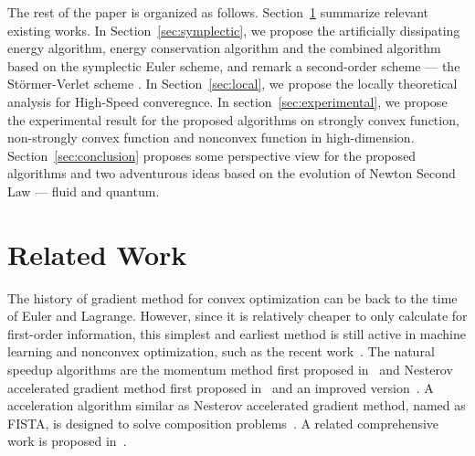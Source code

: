 \documentclass[11pt,fceqn]{article}
\numberwithin{equation}{section}
\theoremstyle{definition}
\begin{document}
The rest of the paper is organized as follows. Section~\ref{sec:related_work} summarize relevant existing works. In Section~\ref{sec:symplectic}, we propose the artificially dissipating energy algorithm, energy conservation algorithm and the combined algorithm based on the symplectic Euler scheme, and remark a second-order scheme --- the St\"{o}rmer-Verlet scheme . In Section~\ref{sec:local}, we propose the locally theoretical analysis for High-Speed converegnce. In section~\ref{sec:experimental}, we propose the experimental result for the proposed algorithms on strongly convex function, non-strongly convex function and nonconvex function in high-dimension. Section~\ref{sec:conclusion} proposes some perspective view for the proposed algorithms and two adventurous ideas based on the evolution of Newton Second Law --- fluid and quantum.


































\section{Related Work}
\label{sec:related_work}

The history of gradient method for convex optimization can be back to the time of Euler and Lagrange. However, since it is relatively cheaper to only calculate for first-order information, this simplest and earliest method is still active in machine learning and nonconvex optimization, such as the recent work~\citep{ge2015escaping, anandkumar2016efficient, lee2016gradient, hardt2016gradient}. The natural speedup algorithms are the momentum method first proposed in~\citep{polyak1964some} and Nesterov accelerated gradient method first proposed in~\citep{nesterov1983method} and an improved version~\citep{nesterov1988general}. A acceleration algorithm similar as Nesterov accelerated gradient method, named as FISTA, is designed to solve composition problems~\citep{beck2009fast}.  A related comprehensive work is proposed in~\citep{bubeck2015convex}.  
\end{document}
